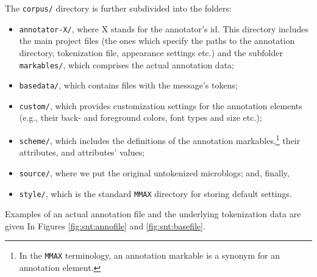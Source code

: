 The \texttt{corpus/} directory is further subdivided into the folders:
{
\setlength{\linewidth}{\textwidth}
\begin{itemize}
\item\texttt{annotator-X/}, where X stands for the annotator's id.
  This directory includes the main project files (the ones which
  specify the paths to the annotation directory, tokenization file,
  appearance settings etc.) and the subfolder \texttt{markables/},
  which comprises the actual annotation data;

\item\texttt{basedata/}, which contains files with the message's
  tokens;

\item\texttt{custom/}, which provides customization settings for the
  annotation elements (e.g., their back- and foreground colors, font
  types and size etc.);

\item\texttt{scheme/}, which includes the definitions of the
  annotation markables,\footnote{In the \texttt{MMAX} terminology,
    an annotation markable is a synonym for an annotation element.}
  their attributes, and attributes' values;

\item\texttt{source/}, where we put the original untokenized
  microblogs; and, finally,
\item\texttt{style/}, which is the standard \texttt{MMAX} directory
  for storing default settings.
\end{itemize}
}

Examples of an actual annotation file and the underlying tokenization
data are given In Figures \ref{fig:snt:annofile} and
\ref{fig:snt:basefile}.


